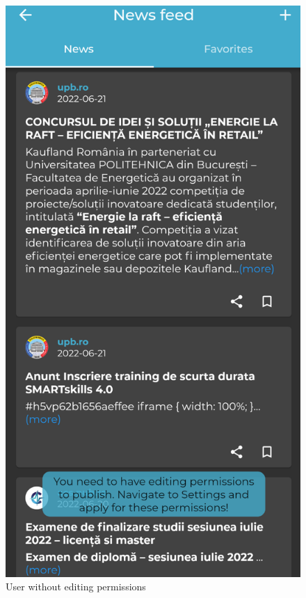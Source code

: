 \begin{figure}[!ht]
    \centering
    \begin{minipage}[b]{0.32\textwidth}
        \captionsetup{justification=centering}
        \includegraphics[width=\textwidth]{figures/app/final/news-feed-no-admin-final.png}
        \caption{User without editing permissions}

\end{minipage}
\end{figure}
